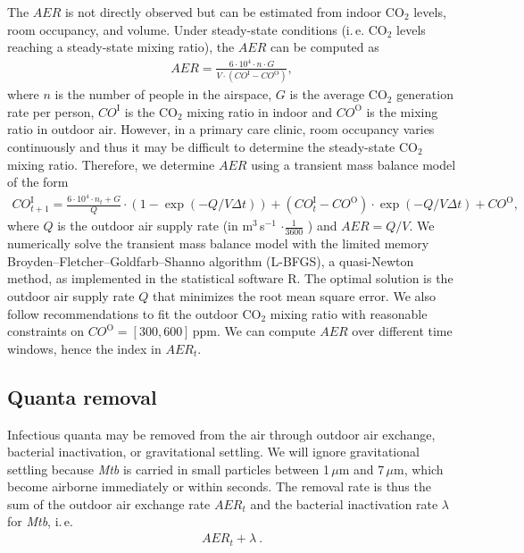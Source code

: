 \documentclass[fleqn,11pt]{wlscirep_supp}
\newcommand\ie{i.\,e.\xspace}
\begin{document}
The $AER$ is not directly observed but can be estimated from indoor CO$_2$ levels, room occupancy, and volume. Under steady-state conditions (\ie CO$_2$ levels reaching a steady-state mixing ratio), the $AER$ can be computed as
\begin{align}
    AER = \frac{6\cdot10^4 \cdot n \cdot G}{V\cdot(CO^{\text{I}}-CO^{\text{O}})},
\end{align}
where $n$ is the number of people in the airspace, $G$ is the average CO$_2$ generation rate per person, $CO^{\text{I}}$ is the CO$_2$ mixing ratio in indoor and $CO^{\text{O}}$ is the mixing ratio in outdoor air\cite{Batterman2017IJERPH}. However, in a primary care clinic, room occupancy varies continuously and thus it may be difficult to determine the steady-state CO$_2$ mixing ratio. Therefore, we determine $AER$ using a transient mass balance model of the form\cite{Batterman2017IJERPH}
\begin{align}
    CO_{t+1}^{\text{I}} = \frac{6\cdot10^4 \cdot n_t + G}{Q} \cdot \left(1 - \exp(-Q/V \Delta t)\right) + (CO_t^{\text{I}}-CO^{\text{O}}) \cdot \exp(-Q/V \Delta t) + CO^{\text{O}},
\end{align}
where $Q$ is the outdoor air supply rate (in m$^3$\,s$^{-1}$ $\cdot \frac{1}{3600}$ ) and $AER = Q/V$. We numerically solve the transient mass balance model with the limited memory Broyden–Fletcher–Goldfarb–Shanno algorithm (L-BFGS), a quasi-Newton method, as implemented in the statistical software R\cite{Byrd1995SIAM}. The optimal solution is the outdoor air supply rate $Q$ that minimizes the root mean square error. We also follow recommendations to fit the outdoor CO$_2$ mixing ratio with reasonable constraints on $CO^{\text{O}} = [300,600]$\,ppm\cite{Batterman2017IJERPH}. We can compute $AER$ over different time windows, hence the index in $AER_t$.

\subsection{Quanta removal}\label{sec:quanta-removal}

Infectious quanta may be removed from the air through outdoor air exchange, bacterial inactivation, or gravitational settling. We will ignore gravitational settling because \emph{Mtb} is carried in small particles between 1\,$\mu$m and 7\,$\mu$m\cite{Fennelly2020Lancet}, which become airborne immediately or within seconds\cite{Vuorinen2020SafSci}. The removal rate is thus the sum of the outdoor air exchange rate $AER_t$ and the bacterial inactivation rate $\lambda$ for \emph{Mtb}, \ie 
\begin{align}\label{eq:removal}
    AER_t + \lambda ~.
\end{align}
\end{document}
